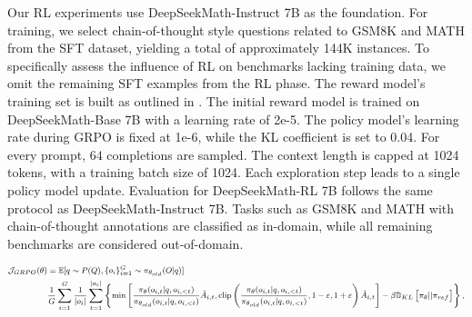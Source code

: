 Our RL experiments use DeepSeekMath-Instruct 7B as the foundation. For training, we select chain-of-thought style questions related to GSM8K and MATH from the SFT dataset, yielding a total of approximately 144K instances. To specifically assess the influence of RL on benchmarks lacking training data, we omit the remaining SFT examples from the RL phase. The reward model’s training set is built as outlined in \citep{wang2023math}. The initial reward model is trained on DeepSeekMath-Base 7B with a learning rate of 2e-5. The policy model's learning rate during GRPO is fixed at 1e-6, while the KL coefficient is set to 0.04. For every prompt, $64$ completions are sampled. The context length is capped at 1024 tokens, with a training batch size of 1024. Each exploration step leads to a single policy model update. Evaluation for DeepSeekMath-RL 7B follows the same protocol as DeepSeekMath-Instruct 7B. Tasks such as GSM8K and MATH with chain-of-thought annotations are classified as in-domain, while all remaining benchmarks are considered out-of-domain.

\begin{equation}
\footnotesize
\begin{split}
    \mathcal{J}_{GRPO}(\theta) &= \mathbb{E}{[q \sim P(Q), \{o_i\}_{i=1}^G \sim \pi_{\theta_{old}}(O|q)]}  \\
    & \frac{1}{G}\sum_{i=1}^G\frac{1}{|o_i|} \sum_{t=1}^{|o_i|} \left\{ \min \left[ \frac{\pi_\theta(o_{i,t} | q, o_{i,<t})}{\pi_{\theta_{old}}(o_{i,t} | q, o_{i,<t})} \hat{A}_{i,t}, \text{clip} \left( \frac{\pi_\theta(o_{i,t} | q, o_{i,<t})}{\pi_{\theta_{old}}(o_{i,t} | q, o_{i,<t})}, 1 - \varepsilon, 1 + \varepsilon \right)  \hat{A}_{i,t} \right] - \beta \mathbb{D}_{KL}\left[\pi_{\theta} || \pi_{ref}\right]\right\} ,
\end{split}
\label{eq:GRPO-obj}
\end{equation}

